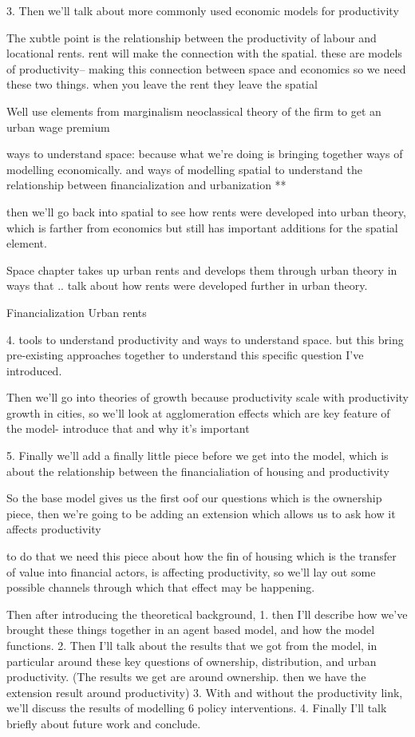 3. Then we'll talk about more commonly used economic models for productivity

The xubtle point is the relationship between the productivity of labour and locational rents.
rent will make the connection with the spatial. 
these are models of productivity-- making this connection between space and economics so we need these two things.
when you leave the rent they leave the spatial

Well use elements from marginalism neoclassical theory of the firm to get an urban wage premium

 ways to understand space: because what we’re doing is bringing together ways of modelling economically. and ways of modelling spatial to understand the relationship between financialization and urbanization **
 
then we'll go back into spatial to see how rents were developed into urban theory, which is farther from economics but still has important additions for the spatial element. 

Space chapter takes up urban rents and develops them through urban theory in ways that .. talk about how rents were developed further in urban theory.

Financialization
Urban rents

4. tools to understand productivity and ways to understand space. but this bring pre-existing approaches together to understand this specific question I've introduced.


Then we'll go into theories of growth because productivity scale with productivity growth in cities, so we'll look at agglomeration effects which are key feature of the model- introduce that and why it's important

5. Finally  we'll add a finally little piece before we get  into the model,  which is about the relationship between the financialiation of housing and productivity

So the base model gives us the first oof our questions which is the ownership piece, then we're going to be adding an extension which allows us to ask how it affects productivity

to do that we need this piece about how the fin of housing which is the transfer of value into financial actors, is affecting productivity, so we'll lay out some possible channels through which that effect may be happening.

Then  after introducing the theoretical background, 
1. then I'll describe how we've brought these things together in an agent based model, and how the model functions. 
2. Then I'll talk about the results that we got from the model, in particular around these key questions of ownership, distribution, and urban productivity.  (The results we get  are around ownership. then we have the extension result around productivity) 
3. With and without the productivity link, we'll discuss the results of modelling 6 policy interventions. 
4. Finally I'll talk briefly about future work and conclude. 





